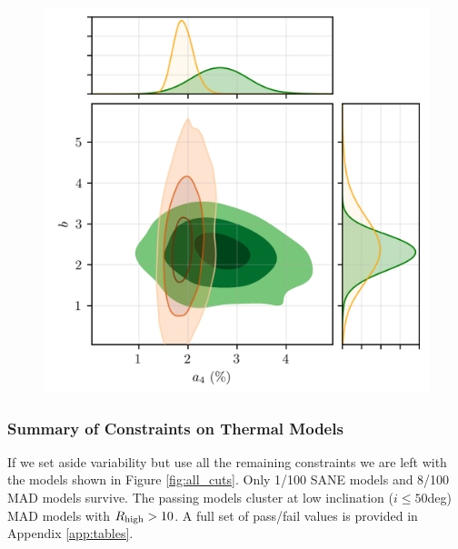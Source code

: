 \begin{figure}
  \centering
  \includegraphics[width=\columnwidth]{./figures/grmhd_fit.png}
  \caption{}
  \label{fig:cmp_VLBI_var}
\end{figure}


\subsubsection{Summary of Constraints on Thermal Models}

If we set aside variability but use all the remaining constraints we are left with the models shown in Figure \ref{fig:all_cuts}.  Only 1/100 SANE models and 8/100 MAD models survive. The passing models cluster at low inclination ($i \le 50$deg) MAD models with $R_\mathrm{high} > 10$.  A full set of pass/fail values is provided in Appendix \ref{app:tables}.

